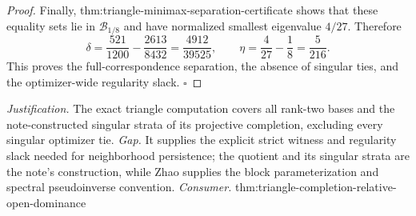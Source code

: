 \documentclass{article}
\begin{document}
\begin{proof}
Finally, thm:triangle-minimax-separation-certificate shows that these equality sets lie in \(\mathcal B_{1/8}\) and have normalized smallest eigenvalue \(4/27\).  Therefore
\[
\delta=\frac{521}{1200}-\frac{2613}{8432}
=\frac{4912}{39525},
\qquad
\eta=\frac4{27}-\frac18=\frac5{216}.
\]
This proves the full-correspondence separation, the absence of singular ties, and the optimizer-wide regularity slack.  \(\square\)
\end{proof}
\par\smallskip\noindent \textit{Justification.} The exact triangle computation covers all rank-two bases and the note-constructed singular strata of its projective completion, excluding every singular optimizer tie. \textit{Gap.} It supplies the explicit strict witness and regularity slack needed for neighborhood persistence; the quotient and its singular strata are the note's construction, while Zhao supplies the block parameterization and spectral pseudoinverse convention. \textit{Consumer.} thm:triangle-completion-relative-open-dominance
\end{document}
